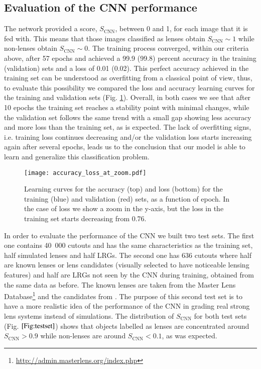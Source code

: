 \documentclass[tradiabstract,twocolumn]{aa}
\begin{document}
\subsection{Evaluation of the CNN performance}\label{subsec:eval}

The network provided a score, $S_{\text{CNN}}$, between 0 and 1, for each image that it is fed with. This means that those images classified as lenses obtain $S_{\text{CNN}} \sim 1 $ while non-lenses obtain $S_{\text{CNN}} \sim 0 $. The training process converged, within our criteria above, after 57 epochs and achieved a 99.9 (99.8) percent accuracy in the training (validation) sets and a loss of 0.01 (0.02). This perfect accuracy achieved in the training set can be understood as overfitting from a classical point of view, thus, to evaluate this possibility we compared the loss and accuracy learning curves for the training and validation sets (Fig. \ref{Fig:accloss}). Overall, in both cases we see that after 10 epochs the training set reaches a stability point with minimal changes, while the validation set follows the same trend with a small gap showing less accuracy and more loss than the training set, as is expected. The lack of overfitting signs, i.e. training loss continues decreasing and/or the validation loss starts increasing again after several epochs, leads us to the conclusion that our model is able to learn and generalize this classification problem. 


\begin{figure}[t!]
\centering
\texttt{[image: accuracy\_loss\_at\_zoom.pdf]}
\caption{Learning curves for the accuracy (top) and loss (bottom) for the training (blue) and validation (red) sets, as a function of epoch. In the case of loss we show a zoom in the y-axis, but the loss in the training set starts decreasing from 0.76.}
\label{Fig:accloss}
\end{figure}

In order to evaluate the performance of the CNN we built two test sets. The first one contains 40~000 cutouts and has the same characteristics as the training set, half simulated lenses and half LRGs. The second one has 636 cutouts where half are known lenses or lens candidates (visually selected to have noticeable lensing features) and half are LRGs not seen by the CNN during training, obtained from the same data as before. The known lenses are taken from the Master Lens Database\footnote{\url{http://admin.masterlens.org/index.php}} and the candidates from \cite{Jacobs2019A,Jacobs2019B}. The purpose of this second test set is to have a more realistic idea of the performance of the CNN in grading real strong lens systems instead of simulations. The distribution of $S_{\text{CNN}}$ for both test sets (Fig. $\ref{Fig:testset}$) shows that objects labelled as lenses are concentrated around $S_{\text{CNN}} > 0.9$ while non-lenses are around  $S_{\text{CNN}} < 0.1$, as was expected. 
\end{document}
